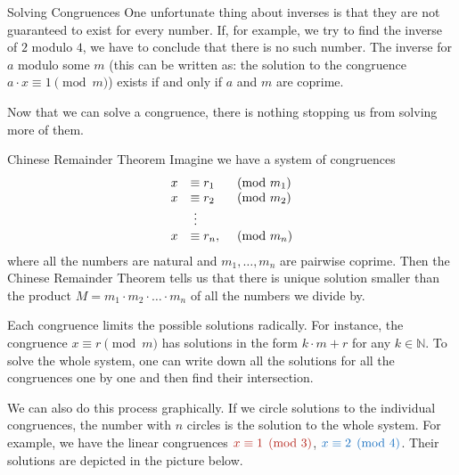 \documentclass[final]{beamer}
\newlength{\colwidth}
\newcommand{\N}{\mathbb{N}}
\newcommand{\clr}{\textcolor{BrickRed}}
\newcommand{\clb}{\textcolor{RoyalBlue}}
\begin{document}
\begin{frame}[t]
\begin{columns}[t]
\begin{column}{\colwidth}
\begin{exampleblock}{Solving Congruences}
One unfortunate thing about inverses is that they are not guaranteed to exist
for every number. If, for example, we try to find the inverse of $2$ modulo $4$,
we have to conclude that there is no such number. The \alert{inverse} for $a$
modulo some $m$ (this can be written as: the solution to the congruence $a \cdot
x \equiv 1 \pmod{m}$) \alert{exists if and only if} $a$ and $m$ \alert{are
coprime}.

Now that we can solve a congruence, there is nothing stopping us from solving
more of them.
\end{exampleblock}
\begin{alertblock}{Chinese Remainder Theorem}
 Imagine we have a \alert{system of congruences}
 \[
  \begin{array}{r l l}
   x & \equiv r_1  &\pmod{m_1}\\
   x & \equiv r_2  &\pmod{m_2}\\
     & \;\vdots &\\
   x & \equiv r_n, &\pmod{m_n}
  \end{array}
 \]
 where all the numbers are natural and $m_1,\ldots, m_n$ are \alert{pairwise
 coprime}. Then the \alert{Chinese Remainder Theorem} tells us that there is
 unique solution smaller than the product $M = m_1 \cdot m_2 \cdot \ldots \cdot
 m_n$ of all the numbers we divide by.

 \alert{Each congruence limits the possible solutions radically}. For instance,
 the congruence $x \equiv r \pmod{m}$ has solutions in the form $k \cdot m + r$
 for any $k \in \N$. To solve the whole system, one can \alert{write down all
 the solutions for all the congruences one by one and then find their
 intersection}.

We can also do this process graphically. If we circle solutions to the
individual congruences, the number with $n$ circles is the solution to the whole
system. For example, we have the linear congruences $\clr{x \equiv 1 \pmod{3}}$,
$\clb{x \equiv 2 \pmod{4}}$. Their solutions are depicted in the picture below.

\begin{center}
\end{center}
\end{alertblock}
\end{column}
\end{columns}
\end{frame}
\end{document}
